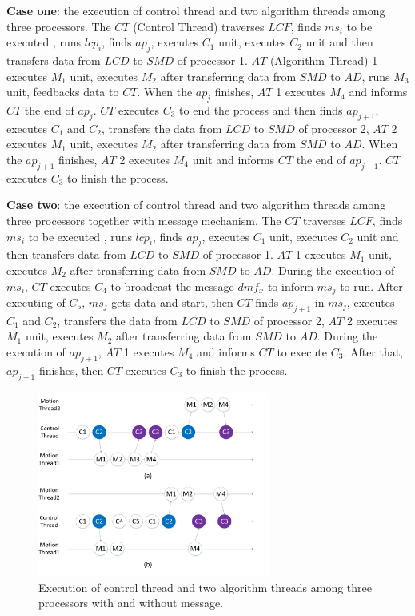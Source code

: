 \documentclass[journal,UTF8]{IEEEtran}
\begin{document}
  \textbf{Case one}: the execution of control thread and two algorithm threads among three processors. The $CT$ (Control Thread) traverses $LCF$, finds $ms_i$ to be executed , runs $lcp_i$, finds $ap_j$, executes $C_1$ unit, executes $C_2$ unit and then transfers data from $LCD$ to $SMD$ of processor 1. $AT$ (Algorithm Thread) 1 executes $M_1$ unit, executes $M_2$ after transferring data from $SMD$ to $AD$, runs $M_3$ unit, feedbacks data to $CT$. When the $ap_j$ finishes, $AT$ 1 executes $M_4$ and informs $CT$ the end of $ap_j$. $CT$ executes $C_3$ to end the process and then finds $ap_{j+1}$, executes $C_1$ and $C_2$, transfers the data from $LCD$ to $SMD$ of processor 2, $AT$ 2 executes $M_1$ unit, executes $M_2$ after transferring data from $SMD$ to $AD$. When the $ap_{j+1}$ finishes, $AT$ 2 executes $M_4$ unit and informs $CT$ the end of $ap_{j+1}$. $CT$ executes $C_3$ to finish the process.
  
  \textbf{Case two}: the execution of control thread and two algorithm threads among three processors together with message mechanism. The $CT$ traverses $LCF$, finds $ms_i$ to be executed , runs $lcp_i$, finds $ap_j$, executes $C_1$ unit, executes $C_2$ unit and then transfers data from $LCD$ to $SMD$ of processor 1. $AT$ 1 executes $M_1$ unit, executes $M_2$ after transferring data from $SMD$ to $AD$. During the execution of $ms_i$, $CT$ executes $C_4$ to broadcast the message $dmf_x$ to inform $ms_{j}$ to run. After executing of $C_5$, $ms_{j}$ gets data and start, then $CT$ finds $ap_{j+1}$ in $ms_{j}$, executes $C_1$ and $C_2$, transfers the data from $LCD$ to $SMD$ of processor 2, $AT$ 2 executes $M_1$ unit, executes $M_2$ after transferring data from $SMD$ to $AD$. During the execution of $ap_{j+1}$, $AT$ 1 executes $M_4$ and informs $CT$ to execute $C_3$. After that, $ap_{j+1}$ finishes, then $CT$ executes $C_3$ to finish the process.
  

  
  \begin{figure}
  	\centering
  	\includegraphics[width=3in]{fig/threadFlow.pdf}
  	\caption{ Execution of control thread and two algorithm threads among three processors with and without message.}
  	\label{fig:threadFlow}
  \end{figure}
\end{document}

